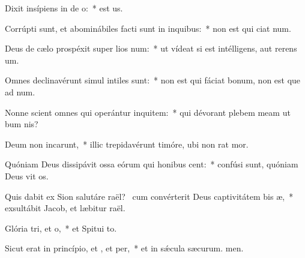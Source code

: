 \item Dixit insípiens in de o:~*  est us.
\item Corrúpti sunt, et abominábiles facti sunt in inquibus:~* non est qui ciat num.
\item Deus de cælo prospéxit super lios num:~* ut vídeat si est intélligens, aut rerens um.
\item Omnes declinavérunt simul intiles  sunt:~* non est qui fáciat bonum, non est que ad num.
\item Nonne scient omnes qui operántur inquitem:~* qui dévorant plebem meam ut bum nis?
\item Deum non incarunt,~* illic trepidavérunt timóre, ubi non rat mor.
\item Quóniam Deus dissipávit ossa eórum qui honibus cent:~* confúsi sunt, quóniam Deus vit os.
\item Quis dabit ex Sion salutáre raël?~\pscross{} cum convérterit Deus captivitátem bis æ,~* exsultábit Jacob, et læbitur raël.
\item Glória tri, et o,~* et Spitui to.
\item Sicut erat in princípio, et , et per,~* et in sǽcula sæcurum. men.
